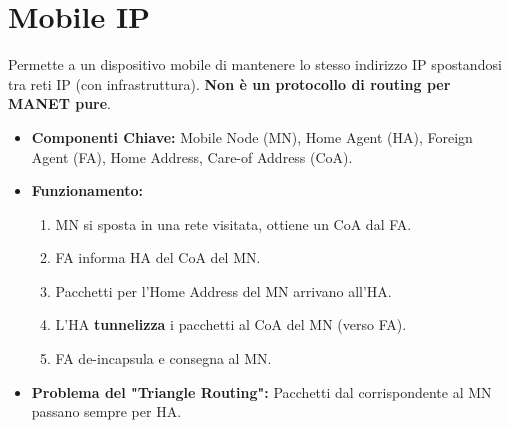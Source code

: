 \section{Mobile IP}
Permette a un dispositivo mobile di mantenere lo stesso indirizzo IP spostandosi tra reti IP (con infrastruttura). \textbf{Non è un protocollo di routing per MANET pure}.
\begin{itemize}
    \item \textbf{Componenti Chiave:} Mobile Node (MN), Home Agent (HA), Foreign Agent (FA), Home Address, Care-of Address (CoA).
    \item \textbf{Funzionamento:}
    \begin{enumerate}
        \item MN si sposta in una rete visitata, ottiene un CoA dal FA.
        \item FA informa HA del CoA del MN.
        \item Pacchetti per l'Home Address del MN arrivano all'HA.
        \item L'HA \textbf{tunnelizza} i pacchetti al CoA del MN (verso FA).
        \item FA de-incapsula e consegna al MN.
    \end{enumerate}
    \item \textbf{Problema del "Triangle Routing":} Pacchetti dal corrispondente al MN passano sempre per HA.
\end{itemize}

